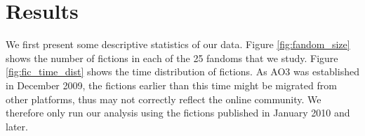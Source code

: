 \documentclass[a4paper]{article}
\begin{document}







\section{Results} 
We first present some descriptive statistics of our data. Figure \ref{fig:fandom_size} shows the number of fictions in each of the 25 fandoms that we study. Figure \ref{fig:fic_time_dist}  shows the time distribution of fictions. As AO3 was established in December 2009, the fictions earlier than this time might be migrated from other platforms, thus may not correctly reflect the online community. We therefore only run our analysis using the fictions published in January 2010 and later. 
\end{document}
